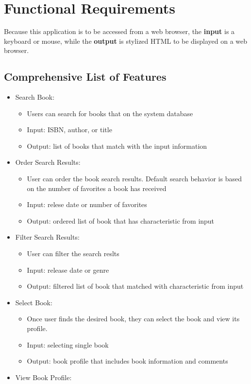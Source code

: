 \documentclass[letter, 12pt, titlepage]{article}
\begin{document}
\section{Functional Requirements}
		Because this application is to be accessed from a web browser, the \textbf{input} is a keyboard or mouse, while the \textbf{output} is stylized HTML to be displayed on a web browser. 

	\subsection{Comprehensive List of Features}
	\begin{itemize}

	\item	Search Book:
		\begin{itemize}
			\item  Users can search for books that on the system database
			\item  Input: ISBN, author, or title
			\item  Output: list of books that match with the input information
		\end{itemize}
	\item	Order Search Results:
		\begin{itemize}
			\item  User can order the book search results. Default search behavior is based on the number of favorites a book has received
			\item  Input: relese date or number of favorites
			\item  Output: ordered list of book that has characteristic from input
		\end{itemize}
	\item	Filter Search Results:
		\begin{itemize}
			\item  User can filter the search reslts 
			\item  Input: release date or genre
			\item  Output: filtered list of book that matched with characteristic from input
		\end{itemize}
	\item	Select Book:
		\begin{itemize}
			\item  Once user finds the desired book, they can select the book and view its profile.
			\item  Input: selecting single book
			\item  Output: book profile that includes book information and comments
		\end{itemize}
	\item	View Book Profile:



\end{itemize}
\end{document}
